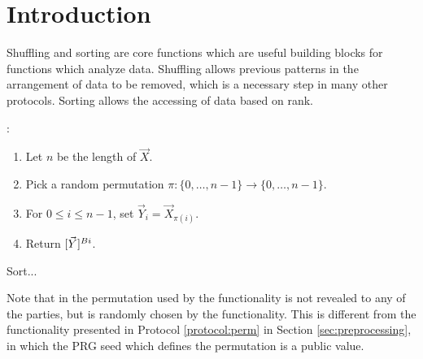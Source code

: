 \section{Introduction}

Shuffling and sorting are core functions which are useful building blocks for
functions which analyze data.
Shuffling allows previous patterns in the arrangement of data to be removed,
which is a necessary step in many other protocols.
Sorting allows the accessing of data based on rank.

\begin{functionality}
	:
	\begin{enumerate}
		\item Let $n$ be the length of $\vec{X}$.
		\item Pick a random permutation 
			$\pi: \{0, \ldots, n-1\} \rightarrow \{0, \ldots, n-1\}$.
		\item For $0 \leq i \leq n-1$, set $\vec{Y}_i = \vec{X}_{\pi(i)}$. 
		\item Return $[\vec{Y}]^{Bi}$.
	\end{enumerate}

	Sort...

\end{functionality}

Note that in \Shuffle{} the permutation used by the functionality is not revealed
to any of the parties, but is randomly chosen by the functionality.
This is different from the functionality \Perm{}{} presented in 
Protocol \ref{protocol:perm} in Section \ref{sec:preprocessing},
in which the PRG seed which defines the permutation is a public value.




